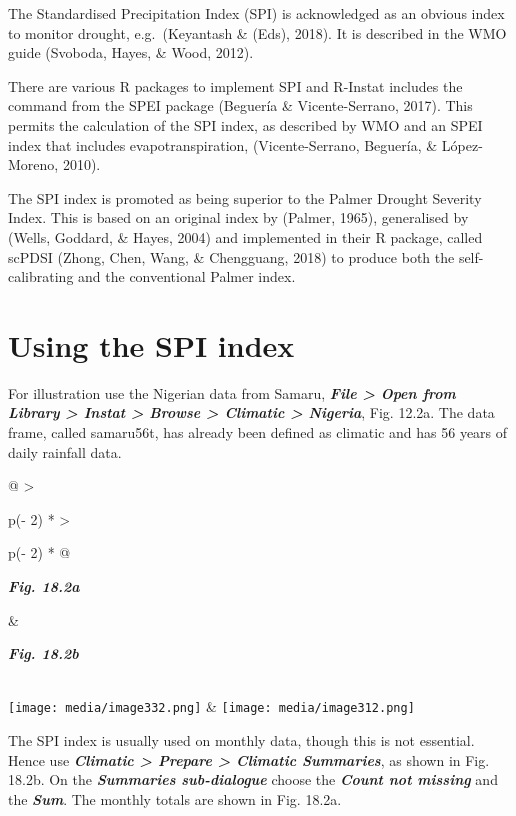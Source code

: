\documentclass[
  letterpaper,
  DIV=11,
  numbers=noendperiod]{scrreprt}
\begin{document}
The Standardised Precipitation Index (SPI) is acknowledged as an obvious
index to monitor drought, e.g.~(Keyantash \& (Eds), 2018). It is
described in the WMO guide (Svoboda, Hayes, \& Wood, 2012).

There are various R packages to implement SPI and R-Instat includes the
command from the SPEI package (Beguería \& Vicente-Serrano, 2017). This
permits the calculation of the SPI index, as described by WMO and an
SPEI index that includes evapotranspiration, (Vicente-Serrano, Beguería,
\& López-Moreno, 2010).

The SPI index is promoted as being superior to the Palmer Drought
Severity Index. This is based on an original index by (Palmer, 1965),
generalised by (Wells, Goddard, \& Hayes, 2004) and implemented in their
R package, called scPDSI (Zhong, Chen, Wang, \& Chengguang, 2018) to
produce both the self-calibrating and the conventional Palmer index.

\section{Using the SPI index}\label{using-the-spi-index}

For illustration use the Nigerian data from Samaru, \textbf{\emph{File
\textgreater{} Open from Library \textgreater{} Instat \textgreater{}
Browse \textgreater{} Climatic \textgreater{} Nigeria}}, Fig. 12.2a. The
data frame, called samaru56t, has already been defined as climatic and
has 56 years of daily rainfall data.

\begin{longtable}[]{@{}
  >{\raggedright\arraybackslash}p{(\columnwidth - 2\tabcolsep) * }
  >{\raggedright\arraybackslash}p{(\columnwidth - 2\tabcolsep) * }@{}}
\toprule\noalign{}
\begin{minipage}[b]{\linewidth}\raggedright
\textbf{\emph{Fig. 18.2a}}
\end{minipage} & \begin{minipage}[b]{\linewidth}\raggedright
\textbf{\emph{Fig. 18.2b}}
\end{minipage} \\
\midrule\noalign{}
\endhead
\bottomrule\noalign{}
\endlastfoot
\texttt{[image: media/image332.png]} &
\texttt{[image: media/image312.png]} \\
\end{longtable}

The SPI index is usually used on monthly data, though this is not
essential. Hence use \textbf{\emph{Climatic \textgreater{} Prepare
\textgreater{} Climatic Summaries}}, as shown in Fig. 18.2b. On the
\textbf{\emph{Summaries sub-dialogue}} choose the \textbf{\emph{Count
not missing}} and the \textbf{\emph{Sum}}. The monthly totals are shown
in Fig. 18.2a.
\end{document}

